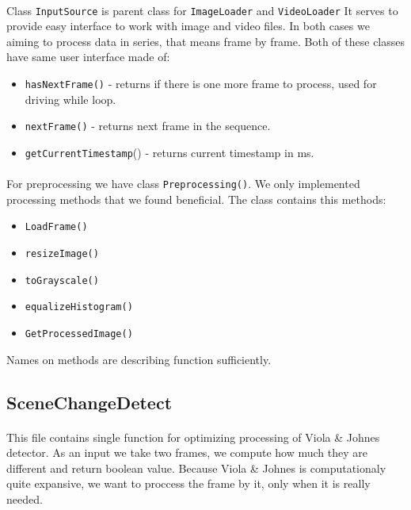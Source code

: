 \documentclass[english]{article}
\begin{document}
		\paragraph{}
			Class \texttt{InputSource} is parent class for \texttt{ImageLoader}
			and \texttt{VideoLoader} It serves to provide easy interface to work with image and video files.
			In both cases we aiming to process data in series, that means frame by frame. 
			Both of these classes have same user interface made of:
			\begin{itemize}
				\item \texttt{hasNextFrame()} - returns if there is one more frame to process, used for driving while loop.
				\item \texttt{nextFrame()} - returns next frame in the sequence.
				\item \texttt{getCurrentTimestamp}() - returns current timestamp in ms.
			\end{itemize}
		\paragraph{}
			For preprocessing we have class \texttt{Preprocessing()}. We only implemented processing methods that we found 
			beneficial. The class contains this methods:
			\begin{itemize}
				\item \texttt{LoadFrame()}
				\item \texttt{resizeImage()}
				\item \texttt{toGrayscale()}
				\item \texttt{equalizeHistogram()}
				\item \texttt{GetProcessedImage()}
			\end{itemize}
			Names on methods are describing function sufficiently.

	\subsection{SceneChangeDetect}
		\paragraph{}
			This file contains single function for optimizing processing of Viola \& Johnes detector.
			As an input we take two frames, we compute how much they are different and return boolean value.
			Because Viola \& Johnes is computationaly quite expansive, we want to proccess the frame by it, only when it is really 
			needed.
			
\end{document}
